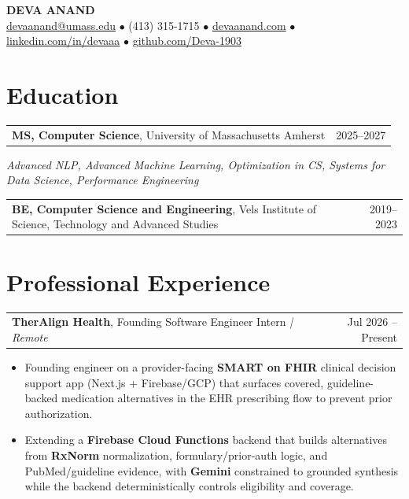 \documentclass[letterpaper,11pt]{article}
\makeatletter
\newcommand{\eduItem}[3]{%
  \begin{tabular*}{\textwidth}{@{}l@{\extracolsep{\fill}}r@{}}
    \textbf{#1}, #2 & #3 \\
  \end{tabular*}\par
}
\newcommand{\expItem}[4]{%
  \vspace{2pt}
  \begin{tabular*}{\textwidth}{@{}l@{\extracolsep{\fill}}r@{}}
    \textbf{#1}, #2 \textit{| #3} & #4 \\
  \end{tabular*}\par\vspace{-3pt}
}
\makeatother
\begin{document}
\begin{center}
    {\fontsize{18}{20}\selectfont\bfseries DEVA ANAND}\\ \vspace{3pt}
    {\small
    \href{mailto:devaanand@umass.edu}{devaanand@umass.edu}
    \enspace$\bullet$\enspace
    (413) 315-1715
    \enspace$\bullet$\enspace
    \href{https://devaanand.com}{devaanand.com}
    \enspace$\bullet$\enspace
    \href{https://linkedin.com/in/devaaa/}{linkedin.com/in/devaaa}
    \enspace$\bullet$\enspace
    \href{https://github.com/Deva-1903}{github.com/Deva-1903}}
\end{center}
\vspace{-8pt}

\section{Education}
\eduItem{MS, Computer Science}{University of Massachusetts Amherst}{2025--2027}
{\small\textit{Advanced NLP, Advanced Machine Learning, Optimization in CS, Systems for Data Science, Performance Engineering}}\par
\vspace{3pt}
\eduItem{BE, Computer Science and Engineering}{Vels Institute of Science, Technology and Advanced Studies}{2019--2023}

\section{Professional Experience}

\expItem{TherAlign Health}{Founding Software Engineer Intern}{Remote}{Jul 2026 -- Present}
\begin{itemize}
  \item Founding engineer on a provider-facing \textbf{SMART on FHIR} clinical decision support app (Next.js + Firebase/GCP) that surfaces covered, guideline-backed medication alternatives in the EHR prescribing flow to prevent prior authorization.
  \item Extending a \textbf{Firebase Cloud Functions} backend that builds alternatives from \textbf{RxNorm} normalization, formulary/prior-auth logic, and PubMed/guideline evidence, with \textbf{Gemini} constrained to grounded synthesis while the backend deterministically controls eligibility and coverage.
\end{itemize}
\end{document}
